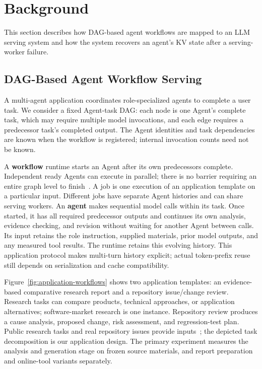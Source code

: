 \section{Background} \label{sec:background} 

This section describes how DAG-based agent workflows are mapped to an LLM serving system and how the system recovers an agent's KV state after a serving-worker failure.

\subsection{DAG-Based Agent Workflow Serving} \label{sec:background:serving} 

A multi-agent application coordinates role-specialized agents to complete a user task. We consider a fixed Agent-task DAG: each node is one Agent's complete task, which may require multiple model invocations, and each edge requires a predecessor task's completed output. The Agent identities and task dependencies are known when the workflow is registered; internal invocation counts need not be known.

A \textbf{workflow} runtime starts an Agent after its own predecessors complete. Independent ready Agents can execute in parallel; there is no barrier requiring an entire graph level to finish~\cite{lin2024parrot}. A job is one execution of an application template on a particular input. Different jobs have separate Agent histories and can share serving workers.
%
An \textbf{agent} makes sequential model calls within its task. Once started, it has all required predecessor outputs and continues its own analysis, evidence checking, and revision without waiting for another Agent between calls. Its input retains the role instruction, supplied materials, prior model outputs, and any measured tool results. The runtime retains this evolving history. This application protocol makes multi-turn history explicit; actual token-prefix reuse still depends on serialization and cache compatibility.

Figure~\ref{fig:application-workflows} shows two application templates: an evidence-based comparative research report and a repository issue/change review. Research tasks can compare products, technical approaches, or application alternatives; software-market research is one instance. Repository review produces a cause analysis, proposed change, risk assessment, and regression-test plan. Public research tasks and real repository issues provide inputs~\cite{du2025deepresearch,li2026deepresearchii,swebenchverified}; the depicted task decomposition is our application design. The primary experiment measures the analysis and generation stage on frozen source materials, and report preparation and online-tool variants separately.

